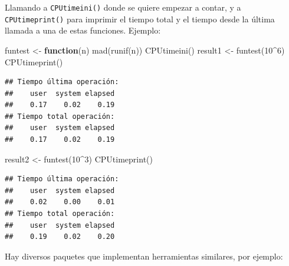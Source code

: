 \documentclass[
]{book}
\newenvironment{Shaded}{\begin{snugshade}}{\end{snugshade}}
\newcommand{\ControlFlowTok}[1]{\textcolor[rgb]{0.13,0.29,0.53}{\textbf{#1}}}
\newcommand{\DecValTok}[1]{\textcolor[rgb]{0.00,0.00,0.81}{#1}}
\newcommand{\FunctionTok}[1]{\textcolor[rgb]{0.00,0.00,0.00}{#1}}
\newcommand{\NormalTok}[1]{#1}
\newcommand{\OtherTok}[1]{\textcolor[rgb]{0.56,0.35,0.01}{#1}}
\newcommand{\SpecialCharTok}[1]{\textcolor[rgb]{0.00,0.00,0.00}{#1}}
\theoremstyle{break}
\theoremstyle{nonumberplain}
\begin{document}
Llamando a \texttt{CPUtimeini()} donde se quiere empezar a contar,
y a \texttt{CPUtimeprint()} para imprimir el tiempo total
y el tiempo desde la última llamada a una de estas funciones.
Ejemplo:

\begin{Shaded}
\begin{Highlighting}[]
\NormalTok{funtest }\OtherTok{\textless{}{-}} \ControlFlowTok{function}\NormalTok{(n) }\FunctionTok{mad}\NormalTok{(}\FunctionTok{runif}\NormalTok{(n)) }
\FunctionTok{CPUtimeini}\NormalTok{()}
\NormalTok{result1 }\OtherTok{\textless{}{-}} \FunctionTok{funtest}\NormalTok{(}\DecValTok{10}\SpecialCharTok{\^{}}\DecValTok{6}\NormalTok{)}
\FunctionTok{CPUtimeprint}\NormalTok{()}
\end{Highlighting}
\end{Shaded}

\begin{verbatim}
## Tiempo última operación:
##    user  system elapsed 
##    0.17    0.02    0.19 
## Tiempo total operación:
##    user  system elapsed 
##    0.17    0.02    0.19
\end{verbatim}

\begin{Shaded}
\begin{Highlighting}[]
\NormalTok{result2 }\OtherTok{\textless{}{-}} \FunctionTok{funtest}\NormalTok{(}\DecValTok{10}\SpecialCharTok{\^{}}\DecValTok{3}\NormalTok{)}
\FunctionTok{CPUtimeprint}\NormalTok{()}
\end{Highlighting}
\end{Shaded}

\begin{verbatim}
## Tiempo última operación:
##    user  system elapsed 
##    0.02    0.00    0.01 
## Tiempo total operación:
##    user  system elapsed 
##    0.19    0.02    0.20
\end{verbatim}

Hay diversos paquetes que implementan herramientas similares, por ejemplo:
\end{document}
